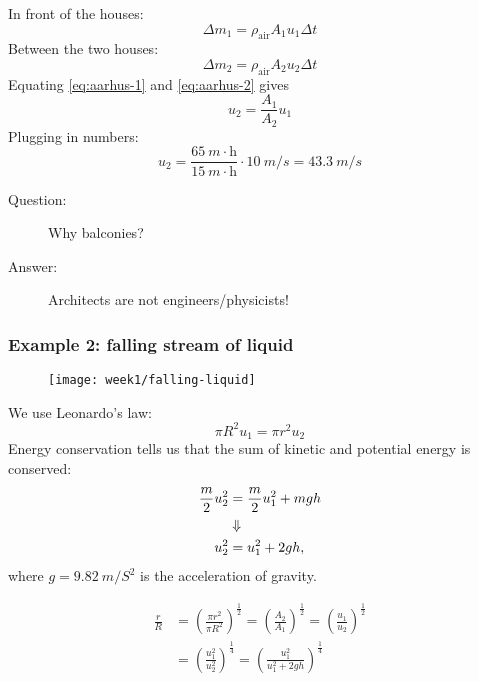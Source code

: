 In front of the houses:
\begin{equation}
    \Delta m_1 = \rho_\mathrm{air} A_1 u_1 \Delta t
    \label{eq:aarhus-1}
\end{equation}
Between the two houses:
\begin{equation}
    \Delta m_2 = \rho_\mathrm{air} A_2 u_2 \Delta t
    \label{eq:aarhus-2}
\end{equation}
Equating \eqref{eq:aarhus-1} and \eqref{eq:aarhus-2} gives
\begin{equation}
    u_2 = \frac{A_1}{A_2} u_1
    \label{}
\end{equation}
Plugging in numbers:
\begin{equation}
    u_2 = \frac{\SI{65}{m}\cdot\mathrm{h}}{\SI{15}{m}\cdot\mathrm{h}} \cdot \SI{10}{m/s} = \SI{43.3}{m/s}
    \label{}
\end{equation}

\begin{description}
    \item[Question:] Why balconies?
    \item[Answer:] Architects are not engineers/physicists!
\end{description}


\subsubsection{Example 2: falling stream of liquid}
\begin{figure}[h!]
    \centering
    \texttt{[image: week1/falling-liquid]}
    \caption{}
    \label{fig:falling-liquid}
\end{figure}

We use Leonardo's law:
\begin{equation}
    \pi R^2 u_1 = \pi r^2 u_2
    \label{}
\end{equation}
Energy conservation tells us that the sum of kinetic and potential energy is conserved:
\begin{align}
    \frac{m}{2}u_2^2 &= \frac{m}{2}u_1^2 + mgh\\
    &\Downarrow\notag\\
    u_2^2 &= u_1^2 + 2gh,
    \label{}
\end{align}
where $g=\SI{9.82}{m/S^2}$ is the acceleration of gravity.

\begin{align}
    \frac{r}{R} &= \left(\frac{\pi r^2}{\pi R^2}\right)^\frac{1}{2} = \left(\frac{A_2}{A_1}\right)^\frac{1}{2} = \left(\frac{u_1}{u_2}\right)^\frac{1}{2}\\
    &= \left(\frac{u_1^2}{u_2^2}\right)^\frac{1}{4} = \left(\frac{u_1^2}{u_1^2+2gh}\right)^\frac{1}{4}
    \label{}
\end{align}

